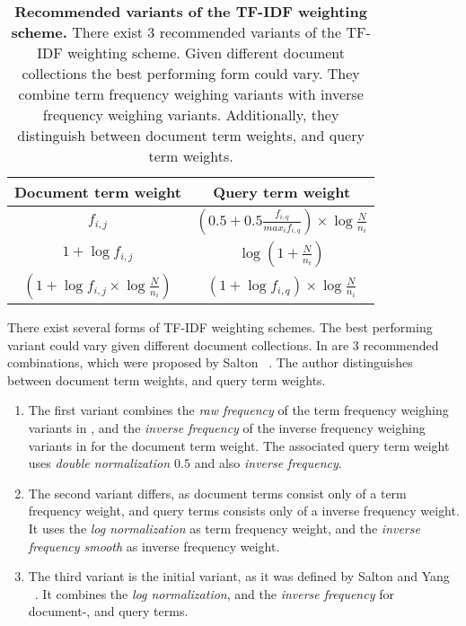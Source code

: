 \begin{table}[b]
    \centering
    \begin{tabular}{ c c }
      \toprule
      \textbf{Document term weight} & \textbf{Query term weight} \\ \midrule
      $f_{i, j}$  & $(0.5 + 0.5 \frac{f_{i, q}}{max_i f_{i, q}}) \times \log \frac{N}{n_i}$  \\
      $1 + \log f_{i, j}$ & $\log (1 + \frac{N}{n_i})$  \\
      $(1 + \log f_{i, j} \times \log \frac{N}{n_i})$ & $(1 + \log f_{i, q}) \times \log \frac{N}{n_i}$  \\
      \bottomrule
    \end{tabular}
  \caption[Recommended variants of the TF-IDF weighting scheme]{\textbf{Recommended variants of the TF-IDF weighting scheme.} There exist $3$ recommended variants of the TF-IDF weighting scheme. Given different document collections the best performing form could vary. They combine term frequency weighing variants with inverse frequency weighing variants. Additionally, they distinguish between document term weights, and query term weights.}
  \label{tbl:recommended_tfidf_weights}
\end{table}
There exist several forms of TF-IDF weighting schemes. The best performing variant could vary given different document collections. In  are $3$ recommended combinations, which were proposed by Salton ~\cite{salton1971}. The author distinguishes between document term weights, and query term weights. 
\begin{enumerate} 
	\item The first variant combines the \textit{raw frequency} of the term frequency weighing variants in , and the \textit{inverse frequency} of the inverse frequency weighing variants in  for the document term weight. The associated query term weight uses \textit{double normalization $0.5$} and also \textit{inverse frequency}.
	\item The second variant differs, as document terms consist only of a term frequency weight, and query terms consists only of a inverse frequency weight. It uses the \textit{log normalization} as term frequency weight, and the \textit{inverse frequency smooth} as inverse frequency weight.
  \item The third variant is the initial variant, as it was defined by Salton and Yang ~\cite{FT023}. It combines the \textit{log normalization}, and the \textit{inverse frequency} for document-, and query terms.
\end{enumerate}

